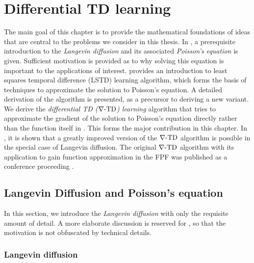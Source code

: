\chapter{Differential TD learning} 
\label{ch:diff_td}
The main goal of this chapter is to provide the mathematical foundations of ideas that are central to the problems we consider in this thesis.
In , a prerequisite introduction to the \textit{Langevin diffusion} and its associated \textit{Poisson's equation} is given. Sufficient motivation is provided as to why solving this equation is important to the applications of interest.  provides an introduction to least squares temporal difference (LSTD) learning algorithm, which forms the basis of techniques to approximate the solution to Poisson's equation. A detailed derivation of the algorithm is presented, as a precursor to deriving a new variant. We derive the \textit{differential TD ($\nabla\text{-TD}$) learning} algorithm that tries to approximate the gradient of the solution to Poisson's equation directly rather than the function itself in . This forms the major contribution in this chapter. In , it is shown that a greatly improved version of the $\nabla\text{-TD}$ algorithm is possible in the special case of Langevin diffusion. The original $\nabla\text{-TD}$ algorithm with its application to gain function approximation in the FPF was published as a conference proceeding \cite{raddevmey16}. 


\section{Langevin Diffusion and Poisson's equation}
\label{s:langevin_diffusion}
In this section, we introduce the \textit{Langevin diffusion} with only the requisite amount of detail. A more elaborate discussion is reserved for , so that the motivation is not obfuscated by  technical details.  

\subsection{Langevin diffusion}

